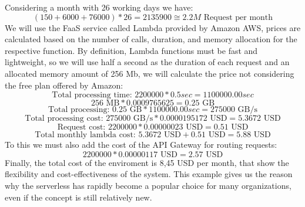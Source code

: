 Considering a month with 26 working days we have:
\begin{equation}
    (150 + 6000 + 76000) * 26 = 2135900 \cong 2.2M \text{ Request per month}
\end{equation}
We will use the FaaS service called Lambda provided by Amazon AWS, prices are calculated based on the number of calls, duration, and memory allocation for the respective function. By definition, Lambda functions must be fast and lightweight, so we will use half a second as the duration of each request and an allocated memory amount of 256 Mb, we will calculate the price not considering the free plan offered by Amazon:
\begin{equation}
    \text{Total processing time: } 2200000 * 0.5 sec = 1100000.00 sec
\end{equation}
\begin{equation}
    256 \text{ MB} * 0.0009765625 = 0.25 \text{ GB}
\end{equation}
\begin{equation}
    \text{Total processing: } 0.25 \text{ GB} * 1100000.00 sec = 275000 \text{ GB/s}
\end{equation}
\begin{equation}
    \text{Total processing cost: } 275000 \text{ GB/s} * 0.0000195172 \text{ USD} = 5.3672 \text{ USD}
\end{equation}
\begin{equation}
    \text{Request cost: } 2200000 * 0.00000023 \text{ USD} = 0.51 \text{ USD}
\end{equation}
\begin{equation}
    \text{Total monthly lambda cost: }5.3672 \text{ USD} + 0.51 \text{ USD} = 5.88 \text{ USD}
\end{equation}
To this we must also add the cost of the API Gateway for routing requests:
\begin{equation}
    2200000 * 0.00000117 \text{ USD} = 2.57 \text{ USD}
\end{equation}
Finally, the total cost of the enviroment is 8,45 USD per month, that show the flexibility and cost-effectiveness of the system. This example gives us the reason why the serverless has rapidly become a popular choice for many organizations, even if the concept is still relatively new.
